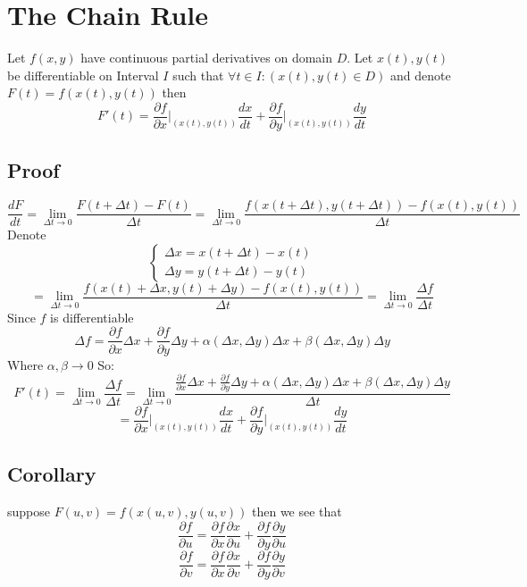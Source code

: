 \documentclass[11pt,a4paper]{article}
\theoremstyle{definition}
\theoremstyle{plain}
\begin{document}
	\newpage
	\section{The Chain Rule}
	Let $f(x,y)$ have continuous partial derivatives on domain $D$. Let $x(t),y(t)$ be differentiable on Interval $I$ such that $\forall t\in I:(x(t),y(t)\in D)$ and denote $F(t) = f(x(t),y(t))$ then
	\[
		F'(t) = \frac{\partial f}{\partial x}\biggr|_{(x(t),y(t))}\frac{dx}{dt} + \frac{\partial f}{\partial y}\biggr|_{(x(t),y(t))}\frac{dy}{dt}
	\]
	\subsection{Proof}
	\[
		\frac{dF}{dt} = \lim_{\Delta t\to 0}{\frac{F(t+\Delta t)-F(t)}{\Delta t}} = \lim_{\Delta t\to 0}{\frac{f(x(t+\Delta t),y(t+\Delta t))-f(x(t),y(t))}{\Delta t}} 
	\]
	Denote
	$$\begin{cases}
	  \Delta x = x(t+\Delta t) - x(t) \\
	  \Delta y = y(t+\Delta t) - y(t) 
	\end{cases}$$
	\[
		= \lim_{\Delta t\to 0}{\frac{f(x(t) + \Delta x,y(t)+\Delta y)-f(x(t),y(t))}{\Delta t}} 
		= \lim_{\Delta t\to 0}{\frac{\Delta f}{\Delta t}}
	\]
	Since $f$ is differentiable
	\[
		\Delta f = \frac{\partial f}{\partial x}\Delta x + \frac{\partial f}{\partial y}\Delta y + \alpha(\Delta x,\Delta y)\Delta x + \beta(\Delta x,\Delta y)\Delta y
	\]
	Where $\alpha,\beta\to 0 $ So:
	\[
		F'(t) = \lim_{\Delta t\to 0}{\frac{\Delta f}{\Delta t}} = \lim_{\Delta t\to 0}{\frac{\frac{\partial f}{\partial x}\Delta x + \frac{\partial f}{\partial y}\Delta y + \alpha(\Delta x,\Delta y)\Delta x + \beta(\Delta x,\Delta y)\Delta y}{\Delta t}}
	\]
	\[
		= \frac{\partial f}{\partial x}\biggr|_{(x(t),y(t))}\frac{dx}{dt} + \frac{\partial f}{\partial y}\biggr|_{(x(t),y(t))}\frac{dy}{dt}
	\]

	\subsection{Corollary}
	suppose $F(u,v) = f(x(u,v),y(u,v))$ then we see that
	\[
		\frac{\partial f}{\partial u} = \frac{\partial f}{\partial x}\frac{\partial x}{\partial u} + \frac{\partial f}{\partial y}\frac{\partial y}{\partial u}
	\]
	\[
		\frac{\partial f}{\partial v} = \frac{\partial f}{\partial x}\frac{\partial x}{\partial v} + \frac{\partial f}{\partial y}\frac{\partial y}{\partial v}
	\]


	\newpage
\end{document}
